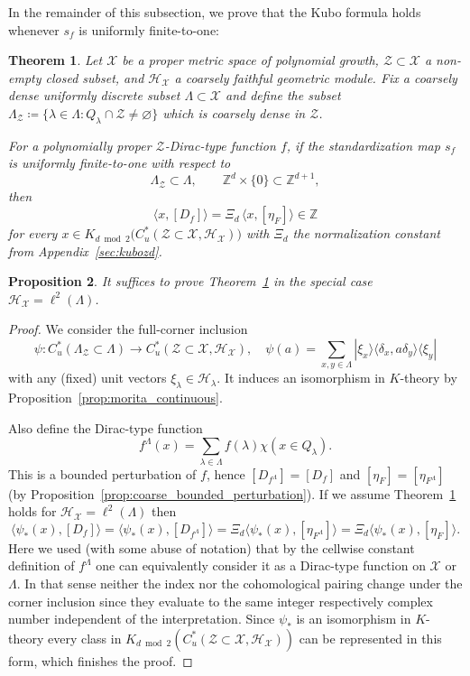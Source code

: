 \documentclass[12pt]{amsart}
\newtheorem{theorem}{Theorem}[section]
\newtheorem{proposition}[theorem]{Proposition}
\newcommand{\ZM}{{\mathbb Z}}
\newcommand{\Hh}{{\mathcal H}}
\newcommand{\Xx}{{\mathcal X}}
\newcommand{\Zz}{{\mathcal Z}}
\begin{document}
In the remainder of this subsection, we prove that the Kubo formula holds whenever $s_f$ is uniformly finite-to-one:
\begin{theorem}
\label{thm:kubo_uniformly_finite}
Let $\Xx$ be a proper metric space of polynomial
growth, $\Zz\subset \Xx$ a non-empty closed subset, and $\Hh_\Xx$ a coarsely faithful geometric module. Fix a coarsely dense uniformly discrete subset $\Lambda\subset\Xx$ and define the subset $\Lambda_\Zz \coloneqq \{\lambda \in \Lambda: Q_{\lambda} \cap \Zz \neq \varnothing \}$ which is coarsely dense in $\Zz$. 

For a polynomially proper $\Zz$-Dirac-type function $f$, if the standardization map $s_f$ is uniformly finite-to-one with respect to
\[\Lambda_\Zz \subset \Lambda, \qquad
\ZM^{d}\times\{0\}\subset\ZM^{d+1},\]
then 
$$\langle x, [D_{f}]\rangle = \Xi_{d}\, \langle x,[\eta_{F}]\rangle \in\ZM$$
for every $x\in K_{d\bmod 2}\bigl(C^*_u(\Zz\subset\Xx,\Hh_\Xx)\bigr)$ with $\Xi_d$ the normalization constant from
Appendix~\ref{sec:kubozd}.
\end{theorem}


\begin{proposition}
\label{prop:kubo_cts_discrete}
It suffices to prove
Theorem~\ref{thm:kubo_uniformly_finite}
in the special case $\Hh_\Xx=\ell^2(\Lambda)$. 
\end{proposition}
\begin{proof}
We consider the full-corner inclusion $$\psi: C^*_u(\Lambda_{\Zz} \subset \Lambda)\to C^*_u(\Zz \subset \Xx, \Hh_\Xx), \quad \psi(a)= \sum_{x,y\in \Lambda} |\xi_x\rangle \langle \delta_x, a\delta_y\rangle \langle \xi_y|$$
with any (fixed) unit vectors $\xi_\lambda \in \Hh_\lambda$. It induces an isomorphism in $K$-theory by Proposition~\ref{prop:morita_continuous}.

Also define the Dirac-type function
$${f}^\Lambda(x) = \sum_{\lambda\in \Lambda} f(\lambda)\chi(x\in Q_\lambda).$$
This is a bounded perturbation of $f$, hence $[D_{f^\Lambda}]=[D_f]$ and $[\eta_F]=[\eta_{F^\Lambda}]$ (by Proposition~\ref{prop:coarse_bounded_perturbation}). If we assume Theorem~\ref{thm:kubo_uniformly_finite} holds for $\Hh_\Xx=\ell^2(\Lambda)$ then
$$\langle \psi_*(x), [D_{f}]\rangle=\langle \psi_*(x), [D_{f^\Lambda}]\rangle = \Xi_d \langle \psi_*(x), [\eta_{F^\Lambda}]\rangle = \Xi_d \langle \psi_*(x), [\eta_F]\rangle.$$
Here we used (with some abuse of notation) that by the cellwise constant definition of $f^\Lambda$ one can equivalently consider it as a Dirac-type function on $\Xx$ or $\Lambda$. In that sense neither the index nor the cohomological pairing change under the corner inclusion since they evaluate to the same integer respectively complex number independent of the interpretation. Since $\psi_*$ is an isomorphism in $K$-theory every class in $K_{d\bmod 2}(C^*_u(\Zz\subset \Xx,\Hh_\Xx))$ can be represented in this form, which finishes the proof.
\end{proof}
\end{document}

